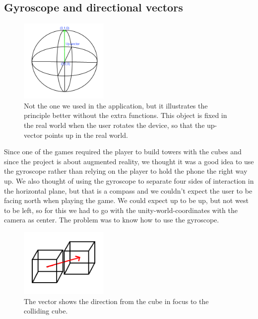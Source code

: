 \subsection{Gyroscope and directional vectors}

\begin{figure}
        \capstart
        \vspace{-20pt}
        \centering
        \includegraphics[width=0.38\textwidth]{images/GyroObjectModel.png}
        \vspace{-20pt}
        \caption[Model of the game-object used to get the direction up]{Not the one we used in the application, but it illustrates the principle better without the extra functions. This object is fixed in the real world when the user rotates the device, so that the up-vector points up in the real world.} 
        \label{fig:Gyro_model} 
        \vspace{-10pt}
\end{figure}

Since one of the games required the player to build towers with the cubes and since the project is about augmented reality, we thought it was a good idea to use the gyroscope rather than relying on the player to hold the phone the right way up. We also thought of using the gyroscope to separate four sides of interaction in the horizontal plane, but that is a compass and we couldn't expect the user to be facing north when playing the game. We could expect up to be up, but not west to be left, so for this we had to go with the unity-world-coordinates with the camera as center. The problem was to know how to use the gyroscope.\\

\begin{figure}
        \capstart
        \vspace{-20pt}
        \centering
        \includegraphics[width=0.38\textwidth]{images/CollisionDirectionObject.png}
        \vspace{-20pt}
        \caption[Model of the collision direction vector]{The vector shows the direction from the cube in focus to the colliding cube.} 
        \label{fig:Collision_Direction_model} 
        \vspace{-10pt}
\end{figure}

